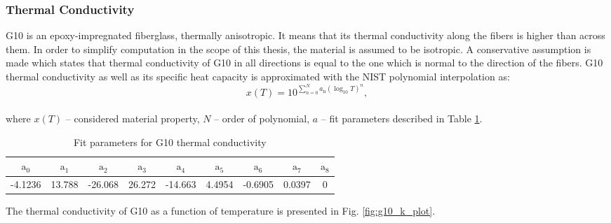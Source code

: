 
\subsubsection{Thermal Conductivity}
G10 is an epoxy-impregnated fiberglass, thermally anisotropic. It means that its thermal conductivity along the fibers is higher than across them. In order to simplify computation in the scope of this thesis, the material is assumed to be isotropic. A conservative assumption is made which states that thermal conductivity of G10 in all directions is equal to the one which is normal to the direction of the fibers.
G10 thermal conductivity as well as its specific heat capacity is approximated with the NIST polynomial interpolation as: 
\begin{equation}
    x(T) = 10^{\sum_{n=0}^{N} a_\text{n}(\log_\text{10}T)^{n}},
    \label{G10_polynomial_interpolation}
\end{equation}
\\
where $x(T)$ -- considered material property, $N$ -- order of polynomial, $a$ -- fit parameters described in Table \ref{table:nist_g10_k_parameters}.

\begin{table}[h!]
    \caption{Fit parameters for G10 thermal conductivity} 
    \vspace{-1.em} 
    \fontsize{10}{10}
    \selectfont 
    \renewcommand{\arraystretch}{1.5}
    \begin{center}
    \begin{tabular}{ ccccccccc }  
    $\text{a}_0$ & $\text{a}_1$ & $\text{a}_2$ & $\text{a}_3$ & $\text{a}_4$ & $\text{a}_5$ & $\text{a}_6$ & $\text{a}_7$ & $\text{a}_8$ \\
    \hline
    -4.1236 & 13.788 & -26.068 & 26.272 & -14.663 & 4.4954 & -0.6905 & 0.0397 & 0 \\
    \hline 
    \end{tabular}
    \end{center}  
     \label{table:nist_g10_k_parameters} 
 \end{table}

The thermal conductivity of G10 as a function of temperature is presented in Fig. \ref{fig:g10_k_plot}.

